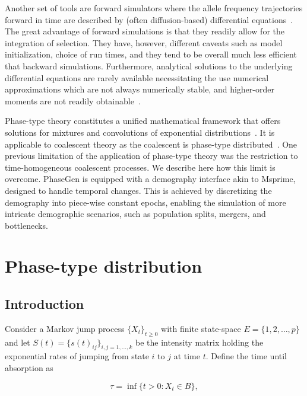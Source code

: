 \documentclass[hidelinks,11pt]{article}
\begin{document}
    Another set of tools are forward simulators where the allele frequency trajectories forward in time are described by (often diffusion-based) differential equations~\citep{dadi,moments}.
    The great advantage of forward simulations is that they readily allow for the integration of selection.
    They have, however, different caveats such as model initialization, choice of run times, and they tend to be overall much less efficient that backward simulations. %
    Furthermore, analytical solutions to the underlying differential equations are rarely available necessitating the use numerical approximations which are not always numerically stable, and higher-order moments are not readily obtainable~\citep{moments}. %

    Phase-type theory constitutes a unified mathematical framework that offers solutions for mixtures and convolutions of exponential distributions~\citep{phasetype}.
    It is applicable to coalescent theory as the coalescent is phase-type distributed~\citep{phasetype_popgen}.
    One previous limitation of the application of phase-type theory was the restriction to time-homogeneous coalescent processes.
    We describe here how this limit is overcome.  %
    PhaseGen is equipped with a demography interface akin to Msprime, designed to handle temporal changes.
    This is achieved by discretizing the demography into piece-wise constant epochs, enabling the simulation of more intricate demographic scenarios, such as population splits, mergers, and bottlenecks.


    \section{Phase-type distribution}\label{sec:phase-type-distribution}

    \subsection{Introduction}\label{subsec:introduction}

    Consider a Markov jump process $\{X_t\}_{t\geq0}$ with finite state-space $E=\{1, 2, \dots,p\}$ and let $S(t)=\{s(t)_{ij} \}_{i,j=1,\dots,k}$ be the intensity matrix holding the exponential rates of jumping from state $i$ to $j$ at time $t$.
    Define the time until absorption as


    \begin{equation*}
        \tau = \inf\{t >0:X_t \in B\},
    \end{equation*}
\end{document}
